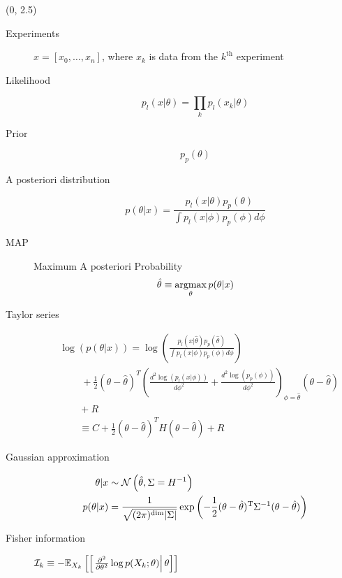 \documentclass[a0]{a0poster}
\begin{document}
\begin{textblock}{6}(0, 2.5)
  \begin{description}
  \item[Experiments] $x=[x_0,\ldots,x_n]$, where $x_k$ is data from
    the $k^\text{th}$ experiment
  \item[Likelihood]
    \begin{equation*}
      p_l(x|\theta) = \prod_k p_l(x_k|\theta)
    \end{equation*}
  \item[Prior]
    \begin{equation*}
      p_p(\theta)
    \end{equation*}
  \item[A posteriori distribution]
    \begin{equation*}
      p(\theta|x) = \frac{p_l(x|\theta) p_p(\theta)}{\int p_l(x|\phi)
        p_p(\phi) d\phi}
    \end{equation*}
  \item[MAP] Maximum A posteriori Probability
    \begin{equation*}
      \hat \theta \equiv \operatorname*{argmax}_{\theta} p(\theta|x)
    \end{equation*}
  \item[Taylor series]
    \begin{align*}
      &\log \left( p(\theta|x) \right) = \log \left( \frac{p_l(x|\hat \theta)
        p_p(\hat \theta)}{\int p_l(x|\phi) p_p(\phi) d\phi} \right) \\
      &\qquad~+ \frac{1}{2}
        \left( \theta - \hat \theta \right)^T \left(
        \frac{d^2 \log\left( p_l(x|\phi) \right) }{d\phi^2} +
        \frac{d^2 \log \left( p_p(\phi) \right) }{d\phi^2} 
        \right)_{\phi=\hat \theta} \left( \theta - \hat \theta
        \right)\\
      &\qquad + R \\
      &\qquad\equiv C + \frac{1}{2}
        \left( \theta - \hat \theta \right)^T H \left( \theta - \hat \theta \right)
        + R
    \end{align*}
  \item[Gaussian approximation]
    \begin{align*}
      \theta|x &\sim {{\cal N}\left( \hat \theta,\Sigma = H^{-1} \right)}\\
      p(\theta|x) &= \frac{1}{\sqrt{(2\pi)^{\text{dim}}|\Sigma|}} \exp\left(
                    -\frac{1}{2}(\theta-\hat\theta)^\mathrm{T}\Sigma^{-1}
                    (\theta-\hat\theta) \right)
    \end{align*}
  \item[Fisher information]
    $\mathcal{I}_k \equiv -
    \mathbb{E}_{X_k}\left[\left[\left. \frac{\partial^2}{\partial\theta^2} \log
          p(X_k;\theta)\right|\theta \right]\right]$
  \end{description}
\end{textblock}
\end{document}
